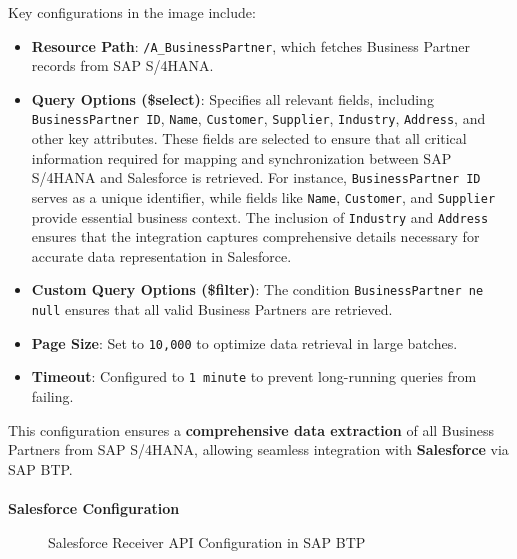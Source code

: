 Key configurations in the image include:
\begin{itemize}
    \item \textbf{Resource Path}: \texttt{/A\_BusinessPartner}, which fetches Business Partner records from SAP S/4HANA.
    \item \textbf{Query Options (\$select)}: Specifies all relevant fields, including \texttt{BusinessPartner ID}, \texttt{Name}, \texttt{Customer}, \texttt{Supplier}, \texttt{Industry}, \texttt{Address}, and other key attributes. These fields are selected to ensure that all critical information required for mapping and synchronization between SAP S/4HANA and Salesforce is retrieved. For instance, \texttt{BusinessPartner ID} serves as a unique identifier, while fields like \texttt{Name}, \texttt{Customer}, and \texttt{Supplier} provide essential business context. The inclusion of \texttt{Industry} and \texttt{Address} ensures that the integration captures comprehensive details necessary for accurate data representation in Salesforce.
    \item \textbf{Custom Query Options (\$filter)}: The condition \texttt{BusinessPartner ne null} ensures that all valid Business Partners are retrieved.
    \item \textbf{Page Size}: Set to \texttt{10,000} to optimize data retrieval in large batches.
    \item \textbf{Timeout}: Configured to \texttt{1 minute} to prevent long-running queries from failing.
\end{itemize}

This configuration ensures a \textbf{comprehensive data extraction} of all Business Partners from SAP S/4HANA, allowing seamless integration with \textbf{Salesforce} via SAP BTP.


\paragraph{}
\textbf{Salesforce Configuration}

\begin{figure}[h]
    \centering
    \caption{Salesforce Receiver API Configuration in SAP BTP}
    \label{fig:sf_receiver_api}
\end{figure}

